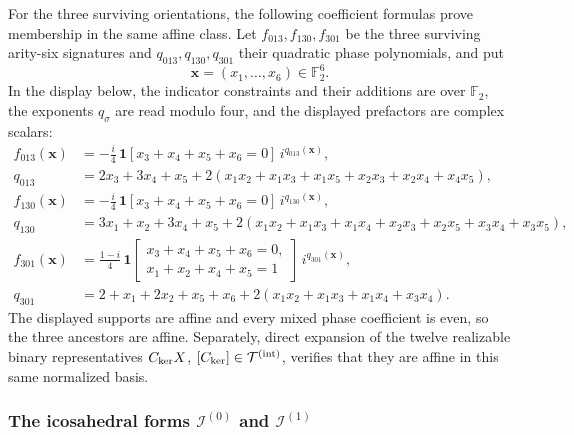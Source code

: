 \documentclass[11pt,letterpaper,onecolumn]{article}
\theoremstyle{plain}
\theoremstyle{definition}
\theoremstyle{remark}
\newcommand{\Ftwo}{\mathbb F_2}
\newcommand{\TetInt}{{\mathcal T^{(\mathrm{int})}}}
\newcommand{\IcoZero}{{\mathcal I^{(0)}}}
\newcommand{\IcoOne}{{\mathcal I^{(1)}}}
\newcommand{\one}{\mathbf 1}
\begin{document}
For the three surviving orientations, the following coefficient formulas
prove membership in the same affine class.  Let
\(f_{013},f_{130},f_{301}\) be the three surviving arity-six signatures and
\(q_{013},q_{130},q_{301}\) their quadratic phase polynomials, and put
\[
 {\mathbf{x}}=(x_1,\ldots,x_6)\in\Ftwo^6.
\]
In the
display below, the indicator constraints and their additions are over
\(\Ftwo\), the exponents \(q_\sigma\) are read modulo four, and the displayed
prefactors are complex scalars:
\begin{align*}
f_{013}({\mathbf{x}})&=-\frac{i}{4}\,
 \one[x_3+x_4+x_5+x_6=0]\,i^{q_{013}({\mathbf{x}})},\\
q_{013}&=2x_3+3x_4+x_5
 +2(x_1x_2+x_1x_3+x_1x_5+x_2x_3+x_2x_4+x_4x_5),\\[1mm]
f_{130}({\mathbf{x}})&=-\frac{i}{4}\,
 \one[x_3+x_4+x_5+x_6=0]\,i^{q_{130}({\mathbf{x}})},\\
q_{130}&=3x_1+x_2+3x_4+x_5
 +2(x_1x_2+x_1x_3+x_1x_4+x_2x_3+x_2x_5+x_3x_4+x_3x_5),\\[1mm]
f_{301}({\mathbf{x}})&=\frac{1-i}{4}\,
 \one[\substack{x_3+x_4+x_5+x_6=0,\\
                     x_1+x_2+x_4+x_5=1}]\,i^{q_{301}({\mathbf{x}})},\\
q_{301}&=2+x_1+2x_2+x_5+x_6
 +2(x_1x_2+x_1x_3+x_1x_4+x_3x_4).
\end{align*}
The displayed supports are affine and every mixed phase coefficient is
even, so the three ancestors are affine.  Separately, direct
expansion of the twelve realizable binary representatives \(C_{\rm ker}X\),
\([C_{\rm ker}]\in\TetInt\), verifies that they are affine in this same normalized
basis.

\subsubsection{The icosahedral forms
  \texorpdfstring{\(\IcoZero\) and \(\IcoOne\)}{I (0) and I (1)}}
\label{proofsubsec:cert-A5}
\end{document}
